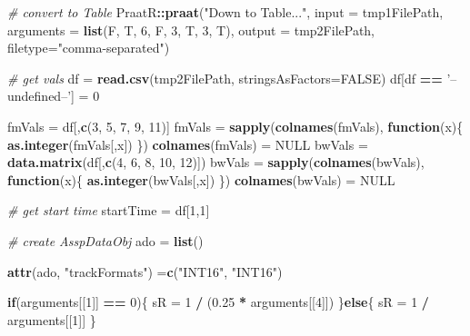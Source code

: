 \documentclass[]{book}
\newenvironment{Shaded}{\begin{snugshade}}{\end{snugshade}}
\newcommand{\CommentTok}[1]{\textcolor[rgb]{0.56,0.35,0.01}{\textit{#1}}}
\newcommand{\ControlFlowTok}[1]{\textcolor[rgb]{0.13,0.29,0.53}{\textbf{#1}}}
\newcommand{\DataTypeTok}[1]{\textcolor[rgb]{0.13,0.29,0.53}{#1}}
\newcommand{\DecValTok}[1]{\textcolor[rgb]{0.00,0.00,0.81}{#1}}
\newcommand{\FloatTok}[1]{\textcolor[rgb]{0.00,0.00,0.81}{#1}}
\newcommand{\KeywordTok}[1]{\textcolor[rgb]{0.13,0.29,0.53}{\textbf{#1}}}
\newcommand{\NormalTok}[1]{#1}
\newcommand{\OperatorTok}[1]{\textcolor[rgb]{0.81,0.36,0.00}{\textbf{#1}}}
\newcommand{\OtherTok}[1]{\textcolor[rgb]{0.56,0.35,0.01}{#1}}
\newcommand{\StringTok}[1]{\textcolor[rgb]{0.31,0.60,0.02}{#1}}
\begin{document}
\begin{Shaded}
\begin{Highlighting}[]
  \CommentTok{# convert to Table}
\NormalTok{  PraatR}\OperatorTok{::}\KeywordTok{praat}\NormalTok{(}\StringTok{"Down to Table..."}\NormalTok{,}
                \DataTypeTok{input =}\NormalTok{ tmp1FilePath,}
                \DataTypeTok{arguments =} \KeywordTok{list}\NormalTok{(F, T, }\DecValTok{6}\NormalTok{, F, }\DecValTok{3}\NormalTok{, T, }\DecValTok{3}\NormalTok{, T),}
                \DataTypeTok{output =}\NormalTok{ tmp2FilePath,}
                \DataTypeTok{filetype=}\StringTok{"comma-separated"}\NormalTok{)}

  \CommentTok{# get vals}
\NormalTok{  df =}\StringTok{ }\KeywordTok{read.csv}\NormalTok{(tmp2FilePath, }\DataTypeTok{stringsAsFactors=}\OtherTok{FALSE}\NormalTok{)}
\NormalTok{  df[df }\OperatorTok{==}\StringTok{ '--undefined--'}\NormalTok{] =}\StringTok{ }\DecValTok{0}

\NormalTok{  fmVals =}\StringTok{ }\NormalTok{df[,}\KeywordTok{c}\NormalTok{(}\DecValTok{3}\NormalTok{, }\DecValTok{5}\NormalTok{, }\DecValTok{7}\NormalTok{, }\DecValTok{9}\NormalTok{, }\DecValTok{11}\NormalTok{)]}
\NormalTok{  fmVals =}\StringTok{ }\KeywordTok{sapply}\NormalTok{(}\KeywordTok{colnames}\NormalTok{(fmVals), }\ControlFlowTok{function}\NormalTok{(x)\{}
    \KeywordTok{as.integer}\NormalTok{(fmVals[,x])}
\NormalTok{  \})}
  \KeywordTok{colnames}\NormalTok{(fmVals) =}\StringTok{ }\OtherTok{NULL}
\NormalTok{  bwVals =}\StringTok{ }\KeywordTok{data.matrix}\NormalTok{(df[,}\KeywordTok{c}\NormalTok{(}\DecValTok{4}\NormalTok{, }\DecValTok{6}\NormalTok{, }\DecValTok{8}\NormalTok{, }\DecValTok{10}\NormalTok{, }\DecValTok{12}\NormalTok{)])}
\NormalTok{  bwVals =}\StringTok{ }\KeywordTok{sapply}\NormalTok{(}\KeywordTok{colnames}\NormalTok{(bwVals), }\ControlFlowTok{function}\NormalTok{(x)\{}
    \KeywordTok{as.integer}\NormalTok{(bwVals[,x])}
\NormalTok{  \})}
  \KeywordTok{colnames}\NormalTok{(bwVals) =}\StringTok{ }\OtherTok{NULL}

  \CommentTok{# get start time}
\NormalTok{  startTime =}\StringTok{ }\NormalTok{df[}\DecValTok{1}\NormalTok{,}\DecValTok{1}\NormalTok{]}

  \CommentTok{# create AsspDataObj}
\NormalTok{  ado =}\StringTok{ }\KeywordTok{list}\NormalTok{()}

  \KeywordTok{attr}\NormalTok{(ado, }\StringTok{"trackFormats"}\NormalTok{) =}\KeywordTok{c}\NormalTok{(}\StringTok{"INT16"}\NormalTok{, }\StringTok{"INT16"}\NormalTok{)}

  \ControlFlowTok{if}\NormalTok{(arguments[[}\DecValTok{1}\NormalTok{]] }\OperatorTok{==}\StringTok{ }\DecValTok{0}\NormalTok{)\{}
\NormalTok{    sR =}\StringTok{ }\DecValTok{1} \OperatorTok{/}\StringTok{ }\NormalTok{(}\FloatTok{0.25} \OperatorTok{*}\StringTok{ }\NormalTok{arguments[[}\DecValTok{4}\NormalTok{]])}
\NormalTok{  \}}\ControlFlowTok{else}\NormalTok{\{}
\NormalTok{    sR =}\StringTok{ }\DecValTok{1} \OperatorTok{/}\StringTok{ }\NormalTok{arguments[[}\DecValTok{1}\NormalTok{]]}
\NormalTok{  \}}


\end{Highlighting}
\end{Shaded}
\end{document}
